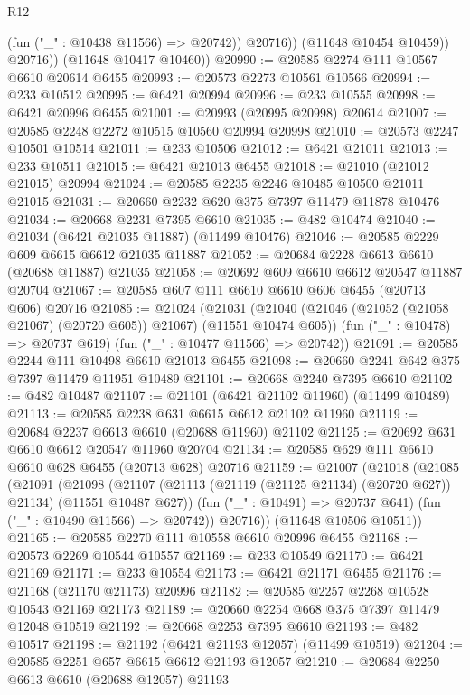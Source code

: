 \begin{lexlean}{R12}
\begin{coremodule}
                  (fun ("_" : @10438 @11566) => @20742))
                @20716))
            (@11648 @10454 @10459))
          @20716))
      (@11648 @10417 @10460))
@20990 := @20585 @2274 @111 @10567 @6610 @20614 @6455
@20993 := @20573 @2273 @10561 @10566
@20994 := @233 @10512
@20995 := @6421 @20994
@20996 := @233 @10555
@20998 := @6421 @20996 @6455
@21001 := @20993 (@20995 @20998) @20614
@21007 := @20585 @2248 @2272 @10515 @10560 @20994 @20998
@21010 := @20573 @2247 @10501 @10514
@21011 := @233 @10506
@21012 := @6421 @21011
@21013 := @233 @10511
@21015 := @6421 @21013 @6455
@21018 := @21010 (@21012 @21015) @20994
@21024 := @20585 @2235 @2246 @10485 @10500 @21011 @21015
@21031 := @20660 @2232 @620 @375 @7397 @11479 @11878 @10476
@21034 := @20668 @2231 @7395 @6610
@21035 := @482 @10474
@21040 := @21034 (@6421 @21035 @11887) (@11499 @10476)
@21046 := @20585 @2229 @609 @6615 @6612 @21035 @11887
@21052 := @20684 @2228 @6613 @6610 (@20688 @11887) @21035
@21058 := @20692 @609 @6610 @6612 @20547 @11887 @20704
@21067 := @20585 @607 @111 @6610 @6610 @606 @6455 (@20713 @606) @20716
@21085 := @21024
    (@21031
      (@21040 (@21046 (@21052 (@21058 @21067) (@20720 @605)) @21067) (@11551 @10474 @605))
      (fun ("_" : @10478) => @20737 @619)
      (fun ("_" : @10477 @11566) => @20742))
@21091 := @20585 @2244 @111 @10498 @6610 @21013 @6455
@21098 := @20660 @2241 @642 @375 @7397 @11479 @11951 @10489
@21101 := @20668 @2240 @7395 @6610
@21102 := @482 @10487
@21107 := @21101 (@6421 @21102 @11960) (@11499 @10489)
@21113 := @20585 @2238 @631 @6615 @6612 @21102 @11960
@21119 := @20684 @2237 @6613 @6610 (@20688 @11960) @21102
@21125 := @20692 @631 @6610 @6612 @20547 @11960 @20704
@21134 := @20585 @629 @111 @6610 @6610 @628 @6455 (@20713 @628) @20716
@21159 := @21007
    (@21018
      (@21085
        (@21091
          (@21098
            (@21107 (@21113 (@21119 (@21125 @21134) (@20720 @627)) @21134) (@11551 @10487 @627))
            (fun ("_" : @10491) => @20737 @641)
            (fun ("_" : @10490 @11566) => @20742))
          @20716))
      (@11648 @10506 @10511))
@21165 := @20585 @2270 @111 @10558 @6610 @20996 @6455
@21168 := @20573 @2269 @10544 @10557
@21169 := @233 @10549
@21170 := @6421 @21169
@21171 := @233 @10554
@21173 := @6421 @21171 @6455
@21176 := @21168 (@21170 @21173) @20996
@21182 := @20585 @2257 @2268 @10528 @10543 @21169 @21173
@21189 := @20660 @2254 @668 @375 @7397 @11479 @12048 @10519
@21192 := @20668 @2253 @7395 @6610
@21193 := @482 @10517
@21198 := @21192 (@6421 @21193 @12057) (@11499 @10519)
@21204 := @20585 @2251 @657 @6615 @6612 @21193 @12057
@21210 := @20684 @2250 @6613 @6610 (@20688 @12057) @21193

\end{coremodule}
\end{lexlean}
